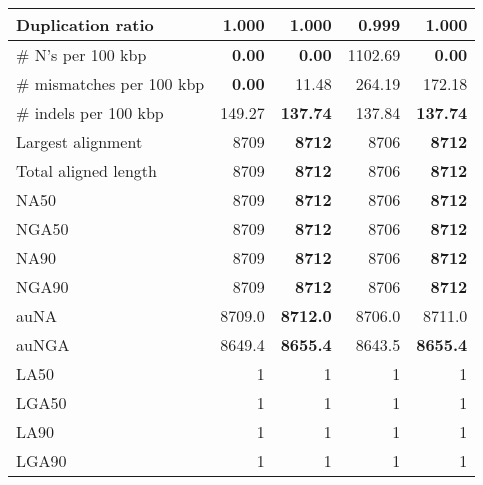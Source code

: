 \documentclass[12pt,a4paper]{article}
\begin{document}
\begin{table}[ht]
\begin{center}
\begin{tabular}{|l*{4}{|r}|}
Duplication ratio & 1.000 & 1.000 & {\bf 0.999} & 1.000 \\ \hline
\# N's per 100 kbp & {\bf 0.00} & {\bf 0.00} & 1102.69 & {\bf 0.00} \\ \hline
\# mismatches per 100 kbp & {\bf 0.00} & 11.48 & 264.19 & 172.18 \\ \hline
\# indels per 100 kbp & 149.27 & {\bf 137.74} & 137.84 & {\bf 137.74} \\ \hline
Largest alignment & 8709 & {\bf 8712} & 8706 & {\bf 8712} \\ \hline
Total aligned length & 8709 & {\bf 8712} & 8706 & {\bf 8712} \\ \hline
NA50 & 8709 & {\bf 8712} & 8706 & {\bf 8712} \\ \hline
NGA50 & 8709 & {\bf 8712} & 8706 & {\bf 8712} \\ \hline
NA90 & 8709 & {\bf 8712} & 8706 & {\bf 8712} \\ \hline
NGA90 & 8709 & {\bf 8712} & 8706 & {\bf 8712} \\ \hline
auNA & 8709.0 & {\bf 8712.0} & 8706.0 & 8711.0 \\ \hline
auNGA & 8649.4 & {\bf 8655.4} & 8643.5 & {\bf 8655.4} \\ \hline
LA50 & 1 & 1 & 1 & 1 \\ \hline
LGA50 & 1 & 1 & 1 & 1 \\ \hline
LA90 & 1 & 1 & 1 & 1 \\ \hline
LGA90 & 1 & 1 & 1 & 1 \\ \hline
\end{tabular}
\end{center}
\end{table}
\end{document}
